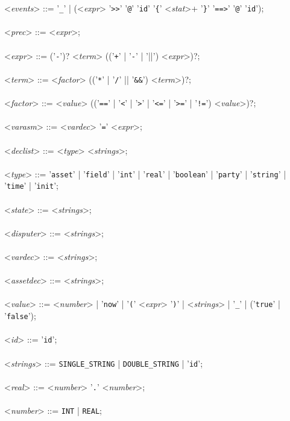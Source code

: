 {  \\\\
  \noindent
  <\textit{events}> ::= '\verb|_|' | (<\textit{expr}> '\verb|>>|' '\verb|@|' '\verb|id|' '\verb|{|' <\textit{stat}>+ '\verb|}|' '\verb|==>|' '\verb|@|' '\verb|id|');
  \\\\
  \noindent
  <\textit{prec}> ::= <\textit{expr}>;
  \\\\
  \noindent
  <\textit{expr}> ::= ('\verb|-|')? <\textit{term}> (('\verb|+|' | '\verb|-|' | '\verb||||') <\textit{expr}>)?;
  \\\\
  \noindent
  <\textit{term}> ::= <\textit{factor}> (('\verb|*|' | '\verb|/|' || '\verb|&&|') <\textit{term}>)?;
  \\\\
  \noindent
  <\textit{factor}> ::= <\textit{value}> (('\verb|==|' | '\verb|<|' | '\verb|>|' | '\verb|<=|' | '\verb|>=|' | '\verb|!=|') <\textit{value}>)?;
  \\\\
  \noindent
  <\textit{varasm}> ::= <\textit{vardec}> '\verb|=|' <\textit{expr}>;
  \\\\
  \noindent
  <\textit{declist}> ::= <\textit{type}> <\textit{strings}>;
  \\\\
  \noindent
  <\textit{type}> ::= '\verb|asset|' | '\verb|field|' | '\verb|int|' | '\verb|real|' | '\verb|boolean|' | '\verb|party|' | '\verb|string|' | '\verb|time|' | '\verb|init|';
  \\\\
  \noindent
  <\textit{state}> ::= <\textit{strings}>;
  \\\\
  \noindent
  <\textit{disputer}> ::= <\textit{strings}>;
  \\\\
  \noindent
  <\textit{vardec}> ::= <\textit{strings}>;
  \\\\
  \noindent
  <\textit{assetdec}> ::= <\textit{strings}>;
  \\\\
  \noindent
  <\textit{value}> ::= <\textit{number}> | '\verb|now|' | '\verb|(|' <\textit{expr}> '\verb|)|' | <\textit{strings}> | '\verb|_|' | ('\verb|true|' | '\verb|false|');
  \\\\
  \noindent
  <\textit{id}> ::= '\verb|id|';
  \\\\
  \noindent
  <\textit{strings}> ::= \verb|SINGLE_STRING| | \verb|DOUBLE_STRING| | '\verb|id|';
  \\\\
  \noindent
  <\textit{real}> ::= <\textit{number}> '\verb|.|' <\textit{number}>;
  \\\\
  \noindent
  <\textit{number}> ::= \verb|INT| | \verb|REAL|;
  \\
}

